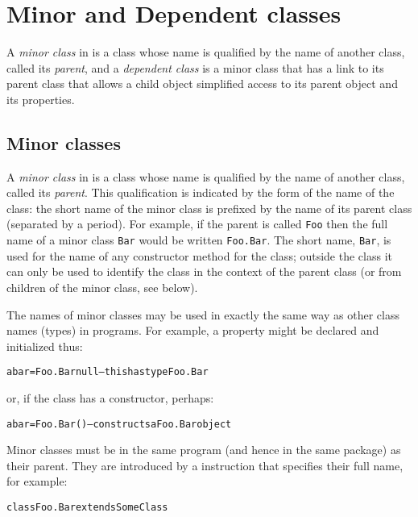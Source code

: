 \chapter{Minor and Dependent classes}\label{refminor}
 
A \emph{minor class} in \nr{} is a class whose name is qualified by
the name of another class, called its \emph{parent}, and a
\emph{dependent class} is a minor class that has a link to its parent
class that allows a child object simplified access to its parent
object and its properties.
\section{Minor classes}\label{refsminorc}
\index{,}
\index{,}
\index{,}
\index{,}
 
A \emph{minor class} in \nr{} is a class whose name is qualified by
the name of another class, called its \emph{parent}.
This qualification is indicated by the form of the name of the class:
the short name of the minor class is prefixed by the name of its parent
class (separated by a period).
For example, if the parent is called \texttt{Foo} then the full name of a
minor class \texttt{Bar} would be written \texttt{Foo.Bar}.
The short name, \texttt{Bar}, is used for the name of any constructor
method for the class; outside the class it can only be used to identify
the class in the context of the parent class (or from children of the
minor class, see below).
 
The names of minor classes may be used in exactly the same way as
other class names (types) in programs.  For example, a property might be
declared and initialized thus:
\begin{alltt}
abar=Foo.Bar null   -- this has type Foo.Bar
\end{alltt}
or, if the class has a constructor, perhaps:
\begin{alltt}
abar=Foo.Bar()      -- constructs a Foo.Bar object
\end{alltt}
 
Minor classes must be in the same program (and hence in the same
package) as their parent.  They are introduced by a 
instruction that specifies their full name, for example:
\begin{alltt}
class Foo.Bar extends SomeClass
\end{alltt}
 

